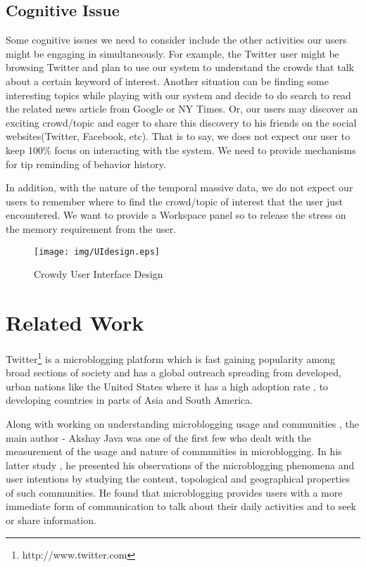 \documentclass{sig-alternate}
\begin{document}
\subsection{Cognitive Issue}
Some cognitive issues we need to consider include the other activities our
users might be engaging in simultaneously. For example, the Twitter user might
be browsing Twitter and plan to use our system to understand the crowds that
talk about a certain keyword of interest. Another situation can be finding some
interesting topics while playing with our system and decide to do search to
read the related news article from Google or NY Times. Or, our users may
discover an exciting crowd/topic and eager to share this discovery to his
friends on the social websites(Twitter, Facebook, etc). That is to say, we does
not expect our user to keep 100\% focus on interacting with the system. We need
to provide mechanisms for tip reminding of behavior history. 

In addition, with the nature of the temporal massive data, we do not expect our
users to remember where to find the crowd/topic of interest that the user just
encountered. We want to provide a Workspace panel so to release the stress on
the memory requirement from the user.

\begin{figure*}[t]
\centering
\texttt{[image: img/UIdesign.eps]}
\caption{Crowdy User Interface Design}
\label{fig:UIdesign}
\end{figure*}

\section{Related Work}
Twitter\footnote{http://www.twitter.com} is a microblogging platform which is
fast gaining popularity\cite{Oreilly:2009} among broad sections of society and
has a global outreach spreading from developed, urban nations like the United
States where it has a high adoption rate \cite{Java:2007}, to developing
countries in parts of Asia and South America.

Along with working on understanding microblogging usage and communities
\cite{Java:2007}, the main author - Akshay Java was one of the first few who
dealt with the measurement of the usage and nature of communities in
microblogging. In his latter study \cite{Java:2008}, he presented his
observations of the microblogging phenomena and user intentions by studying the
content, topological and geographical properties of such communities. He found
that microblogging provides users with a more immediate form of communication
to talk about their daily activities and to seek or share information.
\end{document}
